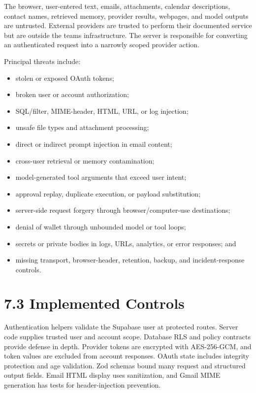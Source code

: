 \documentclass[
]{report}
\providecommand{\tightlist}{%
  \setlength{\itemsep}{0pt}\setlength{\parskip}{0pt}}
\begin{document}
The browser, user-entered text, emails, attachments, calendar
descriptions, contact names, retrieved memory, provider results,
webpages, and model outputs are untrusted. External providers are
trusted to perform their documented service but are outside the
team\textquotesingle s infrastructure. The server is responsible for
converting an authenticated request into a narrowly scoped provider
action.

Principal threats include:

\begin{itemize}
\tightlist
\item
  stolen or exposed OAuth tokens;
\item
  broken user or account authorization;
\item
  SQL/filter, MIME-header, HTML, URL, or log injection;
\item
  unsafe file types and attachment processing;
\item
  direct or indirect prompt injection in email content;
\item
  cross-user retrieval or memory contamination;
\item
  model-generated tool arguments that exceed user intent;
\item
  approval replay, duplicate execution, or payload substitution;
\item
  server-side request forgery through browser/computer-use destinations;
\item
  denial of wallet through unbounded model or tool loops;
\item
  secrets or private bodies in logs, URLs, analytics, or error
  responses; and
\item
  missing transport, browser-header, retention, backup, and
  incident-response controls.
\end{itemize}

\section{7.3 Implemented Controls}\label{73-implemented-controls}

Authentication helpers validate the Supabase user at protected routes.
Server code supplies trusted user and account scope. Database RLS and
policy contracts provide defense in depth. Provider tokens are encrypted
with AES-256-GCM, and token values are excluded from account responses.
OAuth state includes integrity protection and age validation. Zod
schemas bound many request and structured output fields. Email HTML
display uses sanitization, and Gmail MIME generation has tests for
header-injection prevention.
\end{document}
